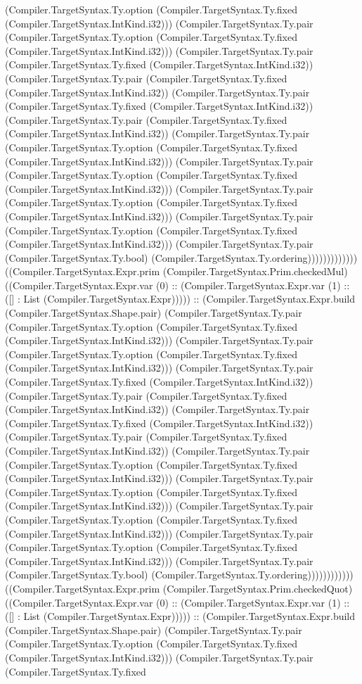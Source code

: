 \documentclass[11pt]{article}
\begin{document}
(Compiler.TargetSyntax.Ty.option (Compiler.TargetSyntax.Ty.fixed (Compiler.TargetSyntax.IntKind.i32))) (Compiler.TargetSyntax.Ty.pair (Compiler.TargetSyntax.Ty.option (Compiler.TargetSyntax.Ty.fixed (Compiler.TargetSyntax.IntKind.i32))) (Compiler.TargetSyntax.Ty.pair (Compiler.TargetSyntax.Ty.fixed (Compiler.TargetSyntax.IntKind.i32)) (Compiler.TargetSyntax.Ty.pair (Compiler.TargetSyntax.Ty.fixed (Compiler.TargetSyntax.IntKind.i32)) (Compiler.TargetSyntax.Ty.pair (Compiler.TargetSyntax.Ty.fixed (Compiler.TargetSyntax.IntKind.i32)) (Compiler.TargetSyntax.Ty.pair (Compiler.TargetSyntax.Ty.fixed (Compiler.TargetSyntax.IntKind.i32)) (Compiler.TargetSyntax.Ty.pair (Compiler.TargetSyntax.Ty.option (Compiler.TargetSyntax.Ty.fixed (Compiler.TargetSyntax.IntKind.i32))) (Compiler.TargetSyntax.Ty.pair (Compiler.TargetSyntax.Ty.option (Compiler.TargetSyntax.Ty.fixed (Compiler.TargetSyntax.IntKind.i32))) (Compiler.TargetSyntax.Ty.pair (Compiler.TargetSyntax.Ty.option (Compiler.TargetSyntax.Ty.fixed (Compiler.TargetSyntax.IntKind.i32))) (Compiler.TargetSyntax.Ty.pair (Compiler.TargetSyntax.Ty.option (Compiler.TargetSyntax.Ty.fixed (Compiler.TargetSyntax.IntKind.i32))) (Compiler.TargetSyntax.Ty.pair (Compiler.TargetSyntax.Ty.bool) (Compiler.TargetSyntax.Ty.ordering))))))))))))) ((Compiler.TargetSyntax.Expr.prim (Compiler.TargetSyntax.Prim.checkedMul) ((Compiler.TargetSyntax.Expr.var (0) :: (Compiler.TargetSyntax.Expr.var (1) :: ([] : List (Compiler.TargetSyntax.Expr))))) :: (Compiler.TargetSyntax.Expr.build (Compiler.TargetSyntax.Shape.pair) (Compiler.TargetSyntax.Ty.pair (Compiler.TargetSyntax.Ty.option (Compiler.TargetSyntax.Ty.fixed (Compiler.TargetSyntax.IntKind.i32))) (Compiler.TargetSyntax.Ty.pair (Compiler.TargetSyntax.Ty.option (Compiler.TargetSyntax.Ty.fixed (Compiler.TargetSyntax.IntKind.i32))) (Compiler.TargetSyntax.Ty.pair (Compiler.TargetSyntax.Ty.fixed (Compiler.TargetSyntax.IntKind.i32)) (Compiler.TargetSyntax.Ty.pair (Compiler.TargetSyntax.Ty.fixed (Compiler.TargetSyntax.IntKind.i32)) (Compiler.TargetSyntax.Ty.pair (Compiler.TargetSyntax.Ty.fixed (Compiler.TargetSyntax.IntKind.i32)) (Compiler.TargetSyntax.Ty.pair (Compiler.TargetSyntax.Ty.fixed (Compiler.TargetSyntax.IntKind.i32)) (Compiler.TargetSyntax.Ty.pair (Compiler.TargetSyntax.Ty.option (Compiler.TargetSyntax.Ty.fixed (Compiler.TargetSyntax.IntKind.i32))) (Compiler.TargetSyntax.Ty.pair (Compiler.TargetSyntax.Ty.option (Compiler.TargetSyntax.Ty.fixed (Compiler.TargetSyntax.IntKind.i32))) (Compiler.TargetSyntax.Ty.pair (Compiler.TargetSyntax.Ty.option (Compiler.TargetSyntax.Ty.fixed (Compiler.TargetSyntax.IntKind.i32))) (Compiler.TargetSyntax.Ty.pair (Compiler.TargetSyntax.Ty.option (Compiler.TargetSyntax.Ty.fixed (Compiler.TargetSyntax.IntKind.i32))) (Compiler.TargetSyntax.Ty.pair (Compiler.TargetSyntax.Ty.bool) (Compiler.TargetSyntax.Ty.ordering)))))))))))) ((Compiler.TargetSyntax.Expr.prim (Compiler.TargetSyntax.Prim.checkedQuot) ((Compiler.TargetSyntax.Expr.var (0) :: (Compiler.TargetSyntax.Expr.var (1) :: ([] : List (Compiler.TargetSyntax.Expr))))) :: (Compiler.TargetSyntax.Expr.build (Compiler.TargetSyntax.Shape.pair) (Compiler.TargetSyntax.Ty.pair (Compiler.TargetSyntax.Ty.option (Compiler.TargetSyntax.Ty.fixed (Compiler.TargetSyntax.IntKind.i32))) (Compiler.TargetSyntax.Ty.pair (Compiler.TargetSyntax.Ty.fixed 
\end{document}
